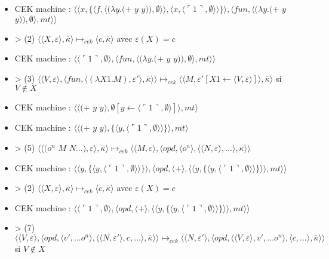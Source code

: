 \documentclass[10pt,a4paper]{report}
\begin{document}
\begin{itemize}
\item[] CEK machine : $\langle\langle x,\{\langle f,\langle(\lambda y.(+$ $y$ $y)),\emptyset\rangle\rangle,\langle x,\langle\ulcorner 1\urcorner,\emptyset\rangle\rangle\}\rangle,\langle fun,\langle(\lambda y.(+$ $y$ $y)),\emptyset\rangle,mt\rangle\rangle$	
\item[] > (2) $\langle\langle X,\varepsilon\rangle,\overline{\kappa}\rangle \longmapsto_{cek} \langle c,\overline{\kappa}\rangle$ avec $\varepsilon(X) = c$
\item[] CEK machine : $\langle \langle\ulcorner 1\urcorner,\emptyset\rangle,\langle fun,\langle(\lambda y.(+$ $y$ $y)),\emptyset\rangle,mt\rangle\rangle$	
\item[] > (3) $\langle\langle V,\varepsilon\rangle,\langle fun,\langle (\lambda X1.M),\varepsilon'\rangle,\overline{\kappa} \rangle \rangle \longmapsto_{cek} \langle \langle M,\varepsilon'[X1 \leftarrow \langle V,\varepsilon\rangle]\rangle,\overline{\kappa}\rangle$ si $V \notin X$
\item[] CEK machine : $\langle\langle(+$ $y$ $y),\emptyset[y \leftarrow\langle\ulcorner 1\urcorner,\emptyset\rangle]\rangle ,mt\rangle$
\item[] CEK machine : $\langle\langle(+$ $y$ $y),\{\langle y,\langle\ulcorner 1\urcorner,\emptyset\rangle\rangle\}\rangle ,mt\rangle$
\item[] > (5) $\langle\langle(o^{n}$ $M$ $N...),\varepsilon\rangle,\overline{\kappa}\rangle \longmapsto_{cek} \langle \langle M,\varepsilon\rangle,\langle opd,\langle o^{n}\rangle,\langle \langle N,\varepsilon\rangle,...\rangle,\overline{\kappa}\rangle\rangle$
\item[] CEK machine : $\langle\langle y,\{\langle y,\langle\ulcorner 1\urcorner,\emptyset\rangle\rangle\}\rangle ,\langle opd,\langle+\rangle,\langle\langle y,\{\langle y,\langle\ulcorner 1\urcorner,\emptyset\rangle\rangle\}\rangle\rangle,mt\rangle\rangle$
\item[] > (2) $\langle\langle X,\varepsilon\rangle,\overline{\kappa}\rangle \longmapsto_{cek} \langle c,\overline{\kappa}\rangle$ avec $\varepsilon(X) = c$
\item[] CEK machine : $\langle\langle\ulcorner 1\urcorner,\emptyset\rangle,\langle opd,\langle+\rangle,\langle\langle y,\{\langle y,\langle\ulcorner 1\urcorner,\emptyset\rangle\rangle\}\rangle\rangle,mt\rangle\rangle$
\item[] > (7) $\langle \langle V,\varepsilon\rangle,\langle opd,\langle v',...o^{n}\rangle,\langle  \langle N,\varepsilon'\rangle,c,...\rangle,\overline{\kappa}\rangle\rangle \longmapsto_{cek} \langle \langle N,\varepsilon'\rangle,\langle opd,\langle  \langle V,\varepsilon\rangle,v',...o^{n}\rangle,\langle c,...\rangle,\overline{\kappa}\rangle\rangle$ si $V \notin X$

\end{itemize}
\end{document}
